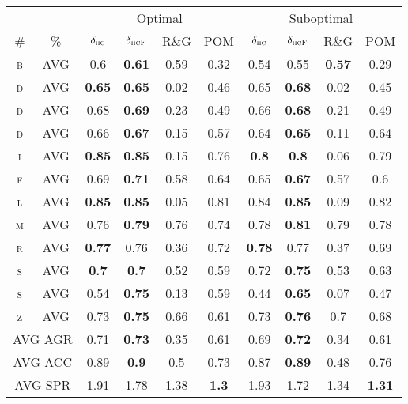 \documentclass[letterpaper]{article}
\newcommand{\dhc}{\ensuremath{\delta_{\textsc{hc}}}}
\newcommand{\dhcf}{\ensuremath{\delta_{\textsc{hcF}}}}
\newcommand{\rg}{R\&G}
\newcommand{\pom}{POM}
\begin{document}
\begin{table*}[]
\centering
\fontsize{5}{6}\selectfont
\setlength\tabcolsep{1.5pt}
\begin{tabular}{cc|cccc|cccc|}
\toprule
 \multicolumn{2}{c}{} & \multicolumn{4}{c}{Optimal} & \multicolumn{4}{c}{Suboptimal}\\
\cmidrule(lr){3-6}\cmidrule(lr){7-10}
%
\# & \% & \dhc & \dhcf & \rg & \pom & \dhc & \dhcf & \rg & \pom\\%
%
\midrule
\textsc{b}%
 & AVG & 0.6 & \textbf{0.61} & 0.59 & 0.32 & 0.54 & 0.55 & \textbf{0.57} & 0.29\\\hline%
\textsc{d}%
 & AVG & \textbf{0.65} & \textbf{0.65} & 0.02 & 0.46 & 0.65 & \textbf{0.68} & 0.02 & 0.45\\\hline%
\textsc{d}%
 & AVG & 0.68 & \textbf{0.69} & 0.23 & 0.49 & 0.66 & \textbf{0.68} & 0.21 & 0.49\\\hline%
\textsc{d}%
 & AVG & 0.66 & \textbf{0.67} & 0.15 & 0.57 & 0.64 & \textbf{0.65} & 0.11 & 0.64\\\hline%
\textsc{i}%
 & AVG & \textbf{0.85} & \textbf{0.85} & 0.15 & 0.76 & \textbf{0.8} & \textbf{0.8} & 0.06 & 0.79\\\hline%
\textsc{f}%
 & AVG & 0.69 & \textbf{0.71} & 0.58 & 0.64 & 0.65 & \textbf{0.67} & 0.57 & 0.6\\\hline%
\textsc{l}%
 & AVG & \textbf{0.85} & \textbf{0.85} & 0.05 & 0.81 & 0.84 & \textbf{0.85} & 0.09 & 0.82\\\hline%
\textsc{m}%
 & AVG & 0.76 & \textbf{0.79} & 0.76 & 0.74 & 0.78 & \textbf{0.81} & 0.79 & 0.78\\\hline%
\textsc{r}%
 & AVG & \textbf{0.77} & 0.76 & 0.36 & 0.72 & \textbf{0.78} & 0.77 & 0.37 & 0.69\\\hline%
\textsc{s}%
 & AVG & \textbf{0.7} & \textbf{0.7} & 0.52 & 0.59 & 0.72 & \textbf{0.75} & 0.53 & 0.63\\\hline%
\textsc{s}%
 & AVG & 0.54 & \textbf{0.75} & 0.13 & 0.59 & 0.44 & \textbf{0.65} & 0.07 & 0.47\\\hline%
\textsc{z}%
 & AVG & 0.73 & \textbf{0.75} & 0.66 & 0.61 & 0.73 & \textbf{0.76} & 0.7 & 0.68\\\hline%

\multicolumn{2}{c|}{AVG AGR} & 0.71 & \textbf{0.73} & 0.35 & 0.61 & 0.69 & \textbf{0.72} & 0.34 & 0.61\\\hline%
\multicolumn{2}{c|}{AVG ACC} & 0.89 & \textbf{0.9} & 0.5 & 0.73 & 0.87 & \textbf{0.89} & 0.48 & 0.76\\\hline%
\multicolumn{2}{c|}{AVG SPR} & 1.91 & 1.78 & 1.38 & \textbf{1.3} & 1.93 & 1.72 & 1.34 & \textbf{1.31}%
\\
\bottomrule
\end{tabular}\\
\caption{}
\end{table*}
\end{document}
